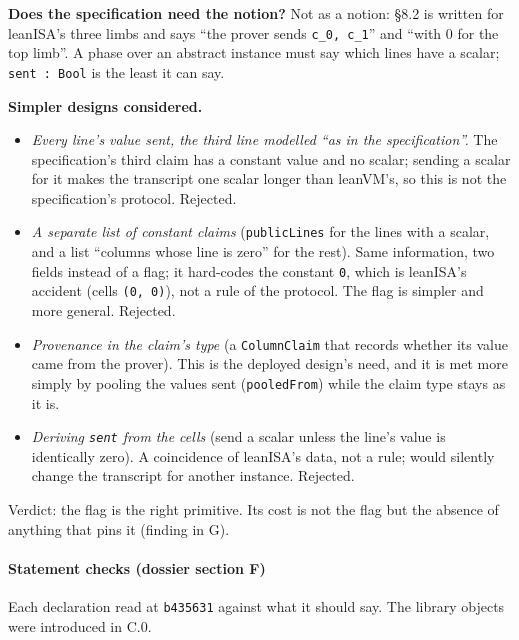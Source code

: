 \textbf{Does the specification need the notion?} Not as a notion: §8.2 is written for leanISA's three limbs and says \enquote{the prover sends \texttt{c\_\allowbreak{}0,\allowbreak{} c\_\allowbreak{}1}} and \enquote{with 0 for the top limb}. A phase over an abstract instance must say which lines have a scalar; \texttt{sent : Bool} is the least it can say.

\textbf{Simpler designs considered.}

\begin{itemize}
\item \emph{Every line's value sent, the third line modelled \enquote{as in the specification}.} The specification's third claim has a constant value and no scalar; sending a scalar for it makes the transcript one scalar longer than leanVM's, so this is not the specification's protocol. Rejected.
\item \emph{A separate list of constant claims} (\texttt{publicLines} for the lines with a scalar, and a list \enquote{columns whose line is zero} for the rest). Same information, two fields instead of a flag; it hard-codes the constant \texttt{0}, which is leanISA's accident (cells \texttt{(\allowbreak{}0,\allowbreak{} 0)}), not a rule of the protocol. The flag is simpler and more general. Rejected.
\item \emph{Provenance in the claim's type} (a \texttt{ColumnClaim} that records whether its value came from the prover). This is the deployed design's need, and it is met more simply by pooling the values sent (\texttt{pooledFrom}) while the claim type stays as it is.
\item \emph{Deriving \texttt{sent} from the cells} (send a scalar unless the line's value is identically zero). A coincidence of leanISA's data, not a rule; would silently change the transcript for another instance. Rejected.
\end{itemize}

Verdict: the flag is the right primitive. Its cost is not the flag but the absence of anything that pins it (finding in G).

\paragraph{Statement checks (dossier section F)}\label{sec:gen-pubinput-F}

Each declaration read at \texttt{b435631} against what it should say. The library objects were introduced in C.0.

